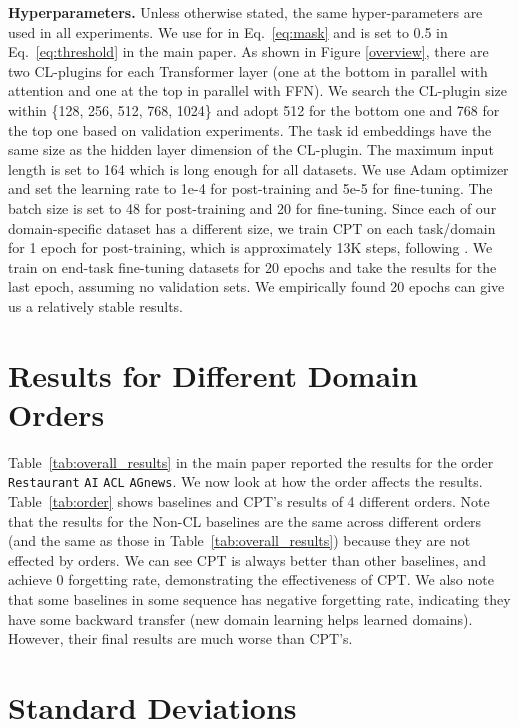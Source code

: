 \documentclass[11pt]{article}
\begin{document}
\textbf{Hyperparameters.}
Unless otherwise stated, the same hyper-parameters are used in all experiments.  We use  for  in Eq.~\ref{eq:mask} and  is set to 0.5 in Eq.~\ref{eq:threshold} in the main paper. 
As shown in Figure \ref{overview}, there are two CL-plugins for each Transformer layer (one at the bottom in parallel with attention and one at the top in parallel with FFN). We search the CL-plugin size within \{128, 256, 512, 768, 1024\} and adopt 512 for the bottom one and 768 for the top one based on validation experiments. The task id embeddings have the same size as the hidden layer dimension of the CL-plugin.
The maximum input length is set to 164 which is long enough for all datasets. We use Adam optimizer and set the learning rate to 1e-4 for post-training and 5e-5 for fine-tuning. The batch size is set to 48 for post-training and 20 for fine-tuning. Since each of our domain-specific dataset has a different size, we train CPT on each task/domain for 1 epoch for post-training, which is approximately 13K steps, following \cite{DBLP:conf/acl/GururanganMSLBD20,DBLP:conf/naacl/XuLSY19}. We train on end-task fine-tuning datasets for 20 epochs and take the results for the last epoch, assuming no validation sets. We empirically found 20 epochs can give us a relatively stable results. 
\fi

\section{Results for Different Domain Orders}
\label{ap:order}

Table~\ref{tab:overall_results} in the main paper reported the results for the order \texttt{Restaurant}  \texttt{AI}  \texttt{ACL}  \texttt{AGnews}. We now look at how the order affects the results.
Table~\ref{tab:order} shows baselines and CPT's results of 4 different orders. Note that the results for the Non-CL baselines are the same across different orders (and the same as those in Table~\ref{tab:overall_results}) because they are not effected by orders. We can see CPT is always better than other baselines, and achieve 0 forgetting rate, demonstrating the effectiveness of CPT. We also note that some baselines in some sequence has negative forgetting rate, indicating they have some backward transfer (new domain learning helps learned domains). However, their final results are much worse than CPT's.

\section{Standard Deviations}
\label{ap:std}
\end{document}
